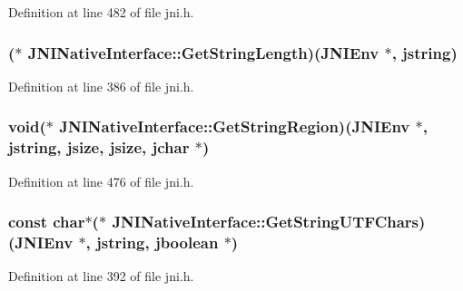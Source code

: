 Definition at line 482 of file jni.\-h.

\hypertarget{struct_j_n_i_native_interface_aecf739c59acc22b2eb0977c0dfc21d93}{
\subsubsection[{Get\-String\-Length}]{($\ast$ J\-N\-I\-Native\-Interface\-::\-Get\-String\-Length)({\bf J\-N\-I\-Env} $\ast$, {\bf jstring})}}\label{struct_j_n_i_native_interface_aecf739c59acc22b2eb0977c0dfc21d93}


Definition at line 386 of file jni.\-h.

\hypertarget{struct_j_n_i_native_interface_ada0faca8c3494d70d50533a9f7e7c5b7}{
\subsubsection[{Get\-String\-Region}]{\setlength{\rightskip}{0pt plus 5cm}void($\ast$ J\-N\-I\-Native\-Interface\-::\-Get\-String\-Region)({\bf J\-N\-I\-Env} $\ast$, {\bf jstring}, {\bf jsize}, {\bf jsize}, {\bf jchar} $\ast$)}}\label{struct_j_n_i_native_interface_ada0faca8c3494d70d50533a9f7e7c5b7}


Definition at line 476 of file jni.\-h.

\hypertarget{struct_j_n_i_native_interface_aab8b77fd70d9d1ff8cfdcb421372f8d9}{
\subsubsection[{Get\-String\-U\-T\-F\-Chars}]{\setlength{\rightskip}{0pt plus 5cm}const char$\ast$($\ast$ J\-N\-I\-Native\-Interface\-::\-Get\-String\-U\-T\-F\-Chars)({\bf J\-N\-I\-Env} $\ast$, {\bf jstring}, {\bf jboolean} $\ast$)}}\label{struct_j_n_i_native_interface_aab8b77fd70d9d1ff8cfdcb421372f8d9}


Definition at line 392 of file jni.\-h.

